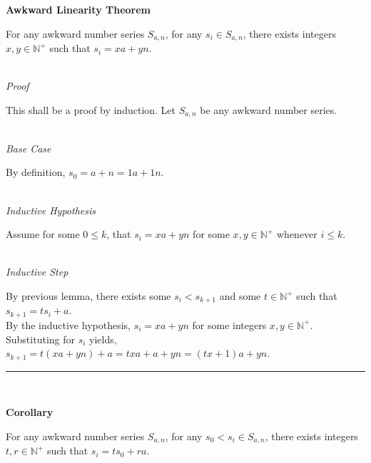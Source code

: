 \documentclass[a4paper,12pt]{article}
\begin{document}
\label{theorem:awkward_linearity}
\hypertarget{theorem:awkward_linearity}{}
\begin{tcolorbox}
\textbf{Awkward Linearity Theorem}

For any awkward number series $S_{a,n}$, for any $s_i \in S_{a,n}$, there exists integers $x, y \in \mathbb{N}^+$ such that $s_i = xa + yn$.

\end{tcolorbox}

\noindent \\
\textit{Proof}

\noindent This shall be a proof by induction. Let $S_{a,n}$ be any awkward number series.


\noindent \\
\textit{Base Case}

\noindent By definition, $s_0 = a + n = 1a + 1n$.


\noindent \\
\textit{Inductive Hypothesis}

\noindent Assume for some $0 \leq k$, that $s_i = xa + yn$ for some $x, y \in \mathbb{N}^+$ whenever $i \leq k$.


\noindent \\
\textit{Inductive Step}

\noindent By previous lemma, there exists some $s_i < s_{k+1}$ and some $t \in \mathbb{N}^+$ such that $s_{k+1} = ts_i + a$.\\

\noindent By the inductive hypothesis, $s_i = xa + yn$ for some integers $x, y \in \mathbb{N}^+$.\\

\noindent Substituting for $s_i$ yields, $s_{k+1} = t(xa + yn) + a = txa + a + yn = (tx + 1)a + yn$.\\



\begin{center}
\noindent\rule{8cm}{0.4pt}
\end{center}
\noindent \\







\label{corollary:relation_to_initial}
\hypertarget{corollary:relation_to_initial}{}
\begin{tcolorbox}
\textbf{Corollary}

For any awkward number series $S_{a,n}$, for any $s_0 < s_i \in S_{a,n}$, there exists integers $t, r \in \mathbb{N}^+$ such that $s_i = ts_0 + ra$.

\end{tcolorbox}
\end{document}
